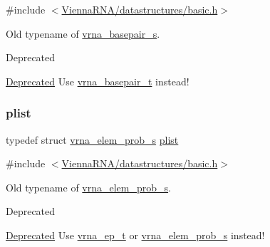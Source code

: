 {\ttfamily \#include $<$\mbox{\hyperlink{datastructures_2basic_8h}{Vienna\+R\+N\+A/datastructures/basic.\+h}}$>$}



Old typename of \mbox{\hyperlink{group__data__structures_structvrna__basepair__s}{vrna\+\_\+basepair\+\_\+s}}. 

\begin{DoxyRefDesc}{Deprecated}
\item[\mbox{\hyperlink{deprecated__deprecated000212}{Deprecated}}]Use \mbox{\hyperlink{group__data__structures_gac8c5669d3fb813cacf506489689305ce}{vrna\+\_\+basepair\+\_\+t}} instead! \end{DoxyRefDesc}
\mbox{\label{group__data__structures_ga9608eed021ebfbdd7a901cfdc446c8e9}} 
\subsubsection{\texorpdfstring{plist}{plist}}
{\footnotesize\ttfamily typedef struct \mbox{\hyperlink{group__struct__utils__plist_structvrna__elem__prob__s}{vrna\+\_\+elem\+\_\+prob\+\_\+s}} \mbox{\hyperlink{group__data__structures_ga9608eed021ebfbdd7a901cfdc446c8e9}{plist}}}



{\ttfamily \#include $<$\mbox{\hyperlink{datastructures_2basic_8h}{Vienna\+R\+N\+A/datastructures/basic.\+h}}$>$}



Old typename of \mbox{\hyperlink{group__struct__utils__plist_structvrna__elem__prob__s}{vrna\+\_\+elem\+\_\+prob\+\_\+s}}. 

\begin{DoxyRefDesc}{Deprecated}
\item[\mbox{\hyperlink{deprecated__deprecated000213}{Deprecated}}]Use \mbox{\hyperlink{group__struct__utils__plist_gab9ac98ab55ded9fb90043b024b915aca}{vrna\+\_\+ep\+\_\+t}} or \mbox{\hyperlink{group__struct__utils__plist_structvrna__elem__prob__s}{vrna\+\_\+elem\+\_\+prob\+\_\+s}} instead! \end{DoxyRefDesc}
\mbox{\label{group__data__structures_ga8412f116a2eb07b59ade9e14ca7c5ef1}} 
